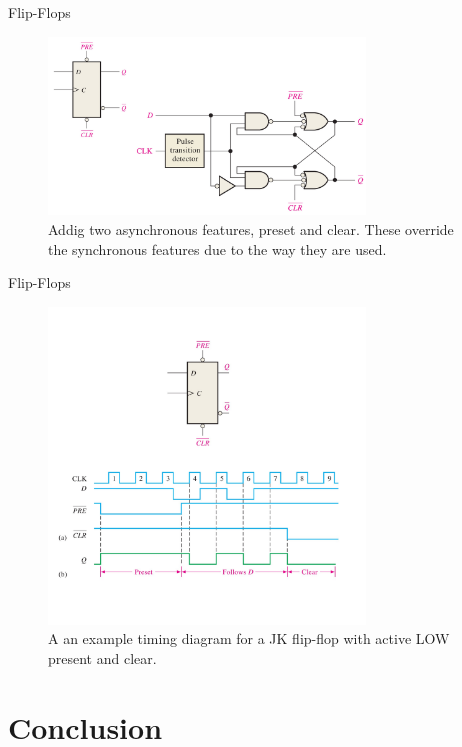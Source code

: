 \documentclass{beamer}
\begin{document}
\begin{frame}{Flip-Flops}
\begin{figure}
\centering
\includegraphics[width=0.75\textwidth]{figures/edge9.pdf}
\caption{\label{fig:ff9} Addig two asynchronous features, preset and clear.  These override the synchronous features due to the way they are used.}
\end{figure}
\end{frame}

\begin{frame}{Flip-Flops}
\begin{figure}
\centering
\includegraphics[width=0.75\textwidth]{figures/edge10.pdf}
\caption{\label{fig:ff10} A an example timing diagram for a JK flip-flop with active LOW present and clear.}
\end{figure}
\end{frame}

\section{Conclusion}
\end{document}
